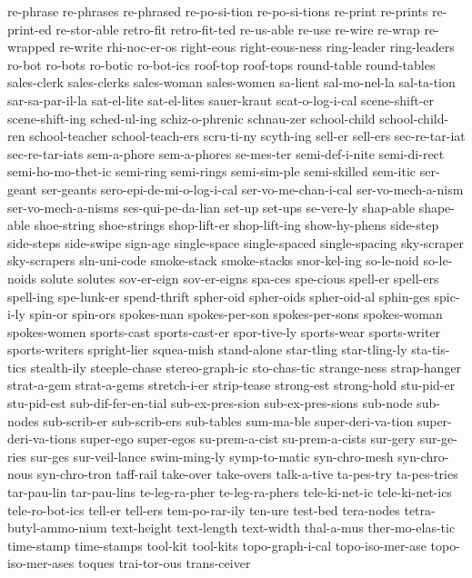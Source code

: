 {re-phrase
re-phrases
re-phrased
re-po-si-tion
re-po-si-tions
re-print
re-prints
re-print-ed
re-stor-able
retro-fit
retro-fit-ted
re-us-able
re-use
re-wire
re-wrap
re-wrapped
re-write
rhi-noc-er-os
right-eous
right-eous-ness
ring-leader
ring-leaders
ro-bot
ro-bots
ro-botic
ro-bot-ics
roof-top
roof-tops
round-table
round-tables
sales-clerk
sales-clerks
sales-woman
sales-women
sa-lient
sal-mo-nel-la
sal-ta-tion
sar-sa-par-il-la
sat-el-lite
sat-el-lites
sauer-kraut
scat-o-log-i-cal
scene-shift-er
scene-shift-ing
sched-ul-ing
schiz-o-phrenic
schnau-zer
school-child
school-child-ren
school-teacher
school-teach-ers
scru-ti-ny
scyth-ing
sell-er
sell-ers
sec-re-tar-iat
sec-re-tar-iats
sem-a-phore
sem-a-phores
se-mes-ter
semi-def-i-nite
semi-di-rect
semi-ho-mo-thet-ic
semi-ring
semi-rings
semi-sim-ple
semi-skilled
sem-itic
ser-geant
ser-geants
sero-epi-de-mi-o-log-i-cal
ser-vo-me-chan-i-cal
ser-vo-mech-a-nism
ser-vo-mech-a-nisms
ses-qui-pe-da-lian
set-up
set-ups
se-vere-ly
shap-able
shape-able
shoe-string
shoe-strings
shop-lift-er
shop-lift-ing
show-hy-phens
side-step
side-steps
side-swipe
sign-age
single-space
single-spaced
single-spacing
sky-scraper
sky-scrapers
sln-uni-code
smoke-stack
smoke-stacks
snor-kel-ing
so-le-noid
so-le-noids
solute
solutes
sov-er-eign
sov-er-eigns
spa-ces
spe-cious
spell-er
spell-ers
spell-ing
spe-lunk-er
spend-thrift
spher-oid
spher-oids
spher-oid-al
sphin-ges
spic-i-ly
spin-or
spin-ors
spokes-man
spokes-per-son
spokes-per-sons
spokes-woman
spokes-women
sports-cast
sports-cast-er
spor-tive-ly
sports-wear
sports-writer
sports-writers
spright-lier
squea-mish
stand-alone
star-tling
star-tling-ly
sta-tis-tics
stealth-ily
steeple-chase
stereo-graph-ic
sto-chas-tic
strange-ness
strap-hanger
strat-a-gem
strat-a-gems
stretch-i-er
strip-tease
strong-est
strong-hold
stu-pid-er
stu-pid-est
sub-dif-fer-en-tial
sub-ex-pres-sion
sub-ex-pres-sions
sub-node
sub-nodes
sub-scrib-er
sub-scrib-ers
sub-tables
sum-ma-ble
super-deri-va-tion
super-deri-va-tions
super-ego
super-egos
su-prem-a-cist
su-prem-a-cists
sur-gery
sur-ge-ries
sur-ges
sur-veil-lance
swim-ming-ly
symp-to-matic
syn-chro-mesh
syn-chro-nous
syn-chro-tron
taff-rail
take-over
take-overs
talk-a-tive
ta-pes-try
ta-pes-tries
tar-pau-lin
tar-pau-lins
te-leg-ra-pher
te-leg-ra-phers
tele-ki-net-ic
tele-ki-net-ics
tele-ro-bot-ics
tell-er
tell-ers
tem-po-rar-ily
ten-ure
test-bed
tera-nodes
tetra-butyl-ammo-nium
text-height
text-length
text-width
thal-a-mus
ther-mo-elas-tic
time-stamp
time-stamps
tool-kit
tool-kits
topo-graph-i-cal
topo-iso-mer-ase
topo-iso-mer-ases
toques
trai-tor-ous
trans-ceiver
}
